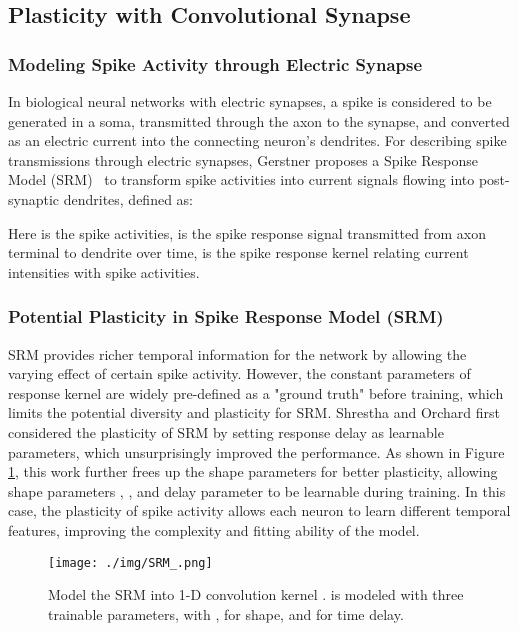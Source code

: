 \documentclass{article}
\begin{document}
\subsection{Plasticity with Convolutional Synapse}



\subsubsection{Modeling Spike Activity through Electric Synapse}
In biological neural networks with electric synapses, a spike is considered to be generated in a soma, transmitted through the axon to the synapse, and converted as an electric current into the connecting neuron's dendrites. For describing spike transmissions through electric synapses, Gerstner  proposes a Spike Response Model (SRM) \ to transform spike activities into current signals flowing into post-synaptic dendrites, defined as:



Here  is the spike activities,  is the spike response signal transmitted from axon terminal to dendrite over time,  is the spike response kernel relating current intensities with spike activities.





\subsubsection{Potential Plasticity in Spike Response Model (SRM)}
SRM provides richer temporal information for the network by allowing the varying effect of certain spike activity. However, the constant parameters of response kernel  are widely pre-defined as a "ground truth" before training, which limits the potential diversity and plasticity for SRM. Shrestha and Orchard  first considered the plasticity of SRM by setting response delay as learnable parameters, which unsurprisingly improved the performance. As shown in Figure \ref{fig:SRM}, this work further frees up the shape parameters for better plasticity, allowing shape parameters , , and delay parameter  to be learnable during training. In this case, the plasticity of spike activity allows each neuron to learn different temporal features, improving the complexity and fitting ability of the model.




\begin{figure}[htbp]
    \centering
    \texttt{[image: ./img/SRM\_.png]}
    \caption{Model the SRM  into 1-D convolution kernel .  is modeled with three trainable parameters, with ,  for shape, and  for time delay.}
    \label{fig:SRM}
\end{figure}
\end{document}
